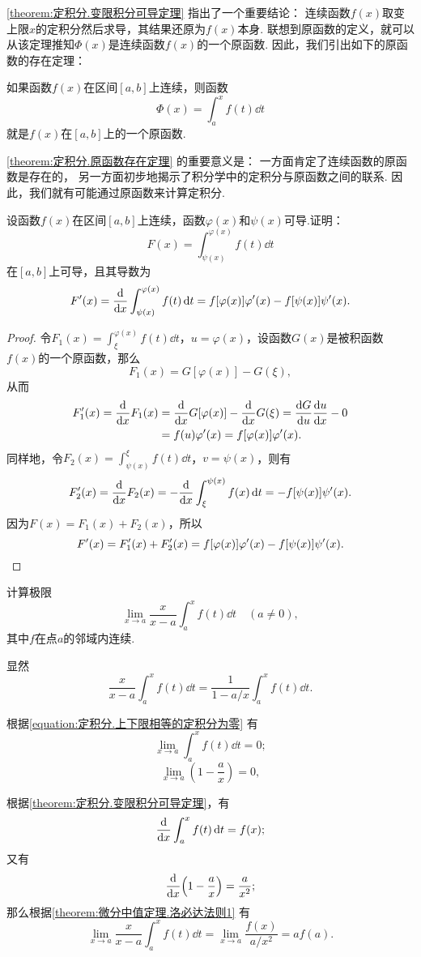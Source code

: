 \cref{theorem:定积分.变限积分可导定理} 指出了一个重要结论：
连续函数\(f(x)\)取变上限\(x\)的定积分然后求导，其结果还原为\(f(x)\)本身.
联想到原函数的定义，就可以从该定理推知\(\Phi(x)\)是连续函数\(f(x)\)的一个原函数.
因此，我们引出如下的原函数的存在定理：
\begin{theorem}[原函数存在定理]\label{theorem:定积分.原函数存在定理}
如果函数\(f(x)\)在区间\([a,b]\)上连续，则函数\[
\Phi(x) = \int_a^x f(t) \dd{t}
\]就是\(f(x)\)在\([a,b]\)上的一个原函数.
\end{theorem}
\cref{theorem:定积分.原函数存在定理} 的重要意义是：
一方面肯定了连续函数的原函数是存在的，
另一方面初步地揭示了积分学中的定积分与原函数之间的联系.
因此，我们就有可能通过原函数来计算定积分.

\begin{example}
设函数\(f(x)\)在区间\([a,b]\)上连续，函数\(\varphi(x)\)和\(\psi(x)\)可导.证明：\[
F(x) = \int_{\psi(x)}^{\varphi(x)} f(t) \dd{t}
\]在\([a,b]\)上可导，且其导数为\begin{equation}\label{equation:定积分.含参变量积分的导数1}
F'(x) = \dv{x} \int_{\psi(x)}^{\varphi(x)} f(t) \dd{t}
= f[\varphi(x)] \varphi'(x) - f[\psi(x)] \psi'(x).
\end{equation}
\begin{proof}
令\(F_1(x) = \int_{\xi}^{\varphi(x)} f(t) \dd{t}\)，\(u = \varphi(x)\)，设函数\(G(x)\)是被积函数\(f(x)\)的一个原函数，那么\[
F_1(x) = G[\varphi(x)] - G(\xi),
\]从而\begin{align*}
F'_1(x) = \dv{x} F_1(x)
&= \dv{x} G[\varphi(x)] - \dv{x} G(\xi) = \dv{G}{u} \dv{u}{x} - 0 \\
&= f(u) \varphi'(x) = f[\varphi(x)] \varphi'(x).
\end{align*}
同样地，令\(F_2(x) = \int_{\psi(x)}^{\xi} f(t) \dd{t}\)，\(v = \psi(x)\)，则有\[
F'_2(x) = \dv{x} F_2(x) = -\dv{x} \int_{\xi}^{\psi(x)} f(x) \dd{t}
= -f[\psi(x)] \psi'(x).
\]
因为\(F(x) = F_1(x) + F_2(x)\)，所以\[
F'(x) = F'_1(x) + F'_2(x)
= f[\varphi(x)] \varphi'(x) - f[\psi(x)] \psi'(x).
\qedhere
\]
\end{proof}
\end{example}

\begin{example}
计算极限\[
\lim\limits_{x \to a} \frac{x}{x-a} \int_a^x f(t) \dd{t}
\quad(a\neq0),
\]其中\(f\)在点\(a\)的邻域内连续.
\begin{solution}
显然\[
\frac{x}{x-a} \int_a^x f(t) \dd{t}
= \frac{1}{1 - a/x} \int_a^x f(t) \dd{t}.
\]

根据\cref{equation:定积分.上下限相等的定积分为零} 有
\[
\lim\limits_{x \to a} \int_a^x f(t) \dd{t} = 0;
\]
\[
\lim\limits_{x \to a} \left( 1 - \frac{a}{x} \right) = 0,
\]

根据\cref{theorem:定积分.变限积分可导定理}，有\[
\dv{x} \int_a^x f(t) \dd{t} = f(x);
\]又有\[
\dv{x}(1 - \frac{a}{x}) = \frac{a}{x^2};
\]那么根据\cref{theorem:微分中值定理.洛必达法则1} 有\[
\lim\limits_{x \to a} \frac{x}{x-a} \int_a^x f(t) \dd{t}
= \lim\limits_{x \to a} \frac{f(x)}{a/x^2}
= a f(a).
\]
\end{solution}
\end{example}

